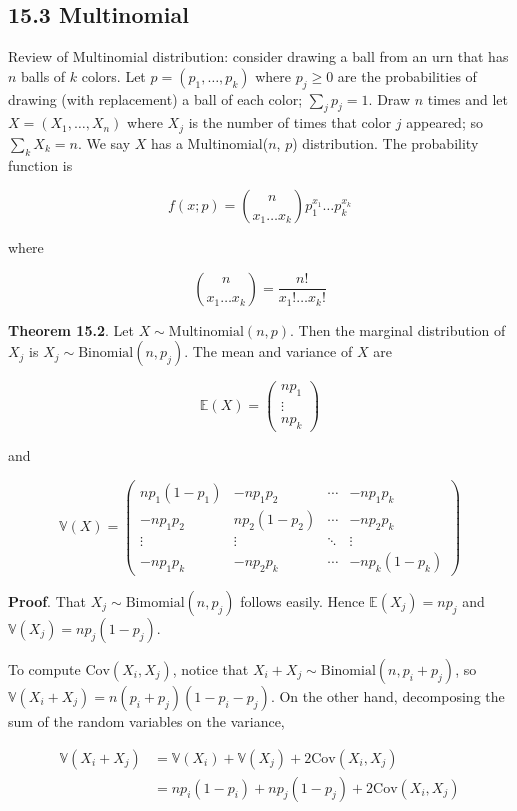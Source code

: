 \subsection{15.3 Multinomial}\label{multinomial}

Review of Multinomial distribution: consider drawing a ball from an urn
that has \(n\) balls of \(k\) colors. Let \(p = (p_1, \dots, p_k)\)
where \(p_j \geq 0\) are the probabilities of drawing (with replacement)
a ball of each color; \(\sum_j p_j = 1\). Draw \(n\) times and let
\(X = (X_1, \dots, X_n)\) where \(X_j\) is the number of times that
color \(j\) appeared; so \(\sum_k X_k = n\). We say \(X\) has a
Multinomial(\(n\), \(p\)) distribution. The probability function is

\[ f(x; p) = \binom{n}{x_1 \dots x_k} p_1^{x_1}\dots p_k^{x_k}\]

where

\[ \binom{n}{x_1 \dots x_k} = \frac{n!}{x_1! \dots x_k!} \]

\textbf{Theorem 15.2}. Let \(X \sim \text{Multinomial}(n, p)\). Then the
marginal distribution of \(X_j\) is
\(X_j \sim \text{Binomial}(n, p_j)\). The mean and variance of \(X\) are

\[\mathbb{E}(X) = \begin{pmatrix} np_1 \\ \vdots \\ np_k \end{pmatrix}\]

and

\[\mathbb{V}(X) = \begin{pmatrix}
np_1(1 - p_1) & -np_1p_2 & \cdots & -np_1p_k \\
-np_1p_2 & np_2(1 - p_2) & \cdots & -np_2p_k \\
\vdots & \vdots & \ddots & \vdots \\
-np_1p_k & -np_2p_k & \cdots & -np_k(1 - p_k)
\end{pmatrix}\]

\textbf{Proof}. That \(X_j \sim \text{Bimomial}(n, p_j)\) follows
easily. Hence \(\mathbb{E}(X_j) = np_j\) and
\(\mathbb{V}(X_j) = np_j(1 - p_j)\).

To compute \(\text{Cov}(X_i, X_j)\), notice that
\(X_i + X_j \sim \text{Binomial}(n, p_i + p_j)\), so
\(\mathbb{V}(X_i + X_j) = n (p_i + p_j) (1 - p_i - p_j)\). On the other
hand, decomposing the sum of the random variables on the variance,

\begin{align}
\mathbb{V}(X_i + X_j) &= \mathbb{V}(X_i) + \mathbb{V}(X_j) + 2 \text{Cov}(X_i, X_j) \\
&= np_i(1 - p_i) + np_j(1 - p_j) + 2 \text{Cov}(X_i, X_j)
\end{align}

